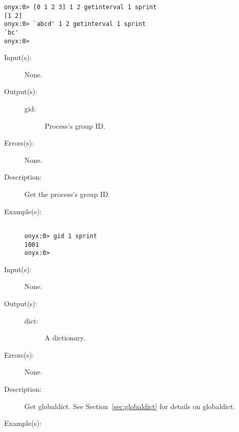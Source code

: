 \begin{description}
\begin{description}
\begin{verbatim}
onyx:0> [0 1 2 3] 1 2 getinterval 1 sprint
[1 2]
onyx:0> `abcd' 1 2 getinterval 1 sprint
`bc'
onyx:0>
		\end{verbatim}
	\end{description}
\label{systemdict:gid}
\item[{\onyxop{--}{gid}{gid}}: ]
	\begin{description}\item[]
	\item[Input(s): ] None.
	\item[Output(s): ]
		\begin{description}\item[]
		\item[gid: ]
			Process's group ID.
		\end{description}
	\item[Errors(s): ] None.
	\item[Description: ]
		Get the process's group ID.
	\item[Example(s): ]\begin{verbatim}

onyx:0> gid 1 sprint
1001
onyx:0>
		\end{verbatim}
	\end{description}
\label{systemdict:globaldict}
\item[{\onyxop{--}{globaldict}{dict}}: ]
	\begin{description}\item[]
	\item[Input(s): ] None.
	\item[Output(s): ]
		\begin{description}\item[]
		\item[dict: ]
			A dictionary.
		\end{description}
	\item[Errors(s): ] None.
	\item[Description: ]
		Get globaldict.  See Section~\ref{sec:globaldict} for details on
		globaldict.
	\item[Example(s): ]\begin{verbatim}


\end{verbatim}
\end{description}
\end{description}
